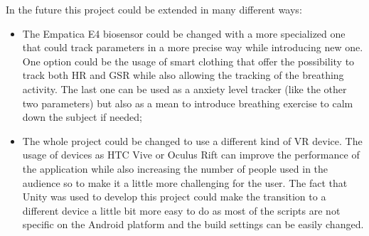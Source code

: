 In the future this project could be extended in many different ways:
\begin{itemize}
	\item The Empatica E4 biosensor could be changed with a more specialized one that could track parameters in a more precise way while introducing new one. One option could be the usage of smart clothing that offer the possibility to track both HR and GSR while also allowing the tracking of the breathing activity. The last one can be used as a anxiety level tracker (like the other two parameters) but also as a mean to introduce breathing exercise to calm down the subject if needed;
	\item The whole project could be changed to use a different kind of VR device. The usage of devices as HTC Vive or Oculus Rift can improve the performance of the application while also increasing the number of people used in the audience so to make it a little more challenging for the user. The fact that Unity was used to develop this project could make the transition to a different device a little bit more easy to do as most of the scripts are not specific on the Android platform and the build settings can be easily changed.
\end{itemize}